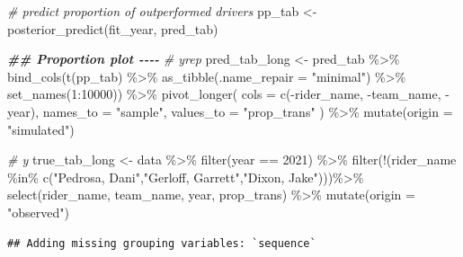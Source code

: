 \documentclass[
]{article}
\newenvironment{Shaded}{\begin{snugshade}}{\end{snugshade}}
\newcommand{\AttributeTok}[1]{\textcolor[rgb]{0.77,0.63,0.00}{#1}}
\newcommand{\CommentTok}[1]{\textcolor[rgb]{0.56,0.35,0.01}{\textit{#1}}}
\newcommand{\DecValTok}[1]{\textcolor[rgb]{0.00,0.00,0.81}{#1}}
\newcommand{\DocumentationTok}[1]{\textcolor[rgb]{0.56,0.35,0.01}{\textbf{\textit{#1}}}}
\newcommand{\FunctionTok}[1]{\textcolor[rgb]{0.00,0.00,0.00}{#1}}
\newcommand{\NormalTok}[1]{#1}
\newcommand{\OtherTok}[1]{\textcolor[rgb]{0.56,0.35,0.01}{#1}}
\newcommand{\SpecialCharTok}[1]{\textcolor[rgb]{0.00,0.00,0.00}{#1}}
\newcommand{\StringTok}[1]{\textcolor[rgb]{0.31,0.60,0.02}{#1}}
\begin{document}
\begin{Shaded}
\begin{Highlighting}[]
\CommentTok{\# predict proportion of outperformed drivers}
\NormalTok{pp\_tab }\OtherTok{\textless{}{-}} \FunctionTok{posterior\_predict}\NormalTok{(fit\_year, pred\_tab)}

\DocumentationTok{\#\# Proportion plot {-}{-}{-}{-}}
\CommentTok{\# yrep}
\NormalTok{pred\_tab\_long }\OtherTok{\textless{}{-}}
\NormalTok{  pred\_tab }\SpecialCharTok{\%\textgreater{}\%}
  \FunctionTok{bind\_cols}\NormalTok{(}\FunctionTok{t}\NormalTok{(pp\_tab) }\SpecialCharTok{\%\textgreater{}\%} \FunctionTok{as\_tibble}\NormalTok{(}\AttributeTok{.name\_repair =} \StringTok{"minimal"}\NormalTok{) }\SpecialCharTok{\%\textgreater{}\%} 
  \FunctionTok{set\_names}\NormalTok{(}\DecValTok{1}\SpecialCharTok{:}\DecValTok{10000}\NormalTok{)) }\SpecialCharTok{\%\textgreater{}\%}
  \FunctionTok{pivot\_longer}\NormalTok{(}
    \AttributeTok{cols      =} \FunctionTok{c}\NormalTok{(}\SpecialCharTok{{-}}\NormalTok{rider\_name, }\SpecialCharTok{{-}}\NormalTok{team\_name, }\SpecialCharTok{{-}}\NormalTok{year),}
    \AttributeTok{names\_to  =} \StringTok{"sample"}\NormalTok{,}
    \AttributeTok{values\_to =} \StringTok{"prop\_trans"}
\NormalTok{  ) }\SpecialCharTok{\%\textgreater{}\%}
  \FunctionTok{mutate}\NormalTok{(}\AttributeTok{origin =} \StringTok{"simulated"}\NormalTok{)}

\CommentTok{\# y}
\NormalTok{true\_tab\_long }\OtherTok{\textless{}{-}}
\NormalTok{  data }\SpecialCharTok{\%\textgreater{}\%}
  \FunctionTok{filter}\NormalTok{(year }\SpecialCharTok{==} \DecValTok{2021}\NormalTok{) }\SpecialCharTok{\%\textgreater{}\%}
  \FunctionTok{filter}\NormalTok{(}\SpecialCharTok{!}\NormalTok{(rider\_name }\SpecialCharTok{\%in\%} \FunctionTok{c}\NormalTok{(}\StringTok{"Pedrosa, Dani"}\NormalTok{,}\StringTok{"Gerloff, Garrett"}\NormalTok{,}\StringTok{"Dixon, Jake"}\NormalTok{)))}\SpecialCharTok{\%\textgreater{}\%} 
  \FunctionTok{select}\NormalTok{(rider\_name, team\_name, year, prop\_trans) }\SpecialCharTok{\%\textgreater{}\%}
  \FunctionTok{mutate}\NormalTok{(}\AttributeTok{origin =} \StringTok{"observed"}\NormalTok{)}
\end{Highlighting}
\end{Shaded}

\begin{verbatim}
## Adding missing grouping variables: `sequence`
\end{verbatim}
\end{document}
